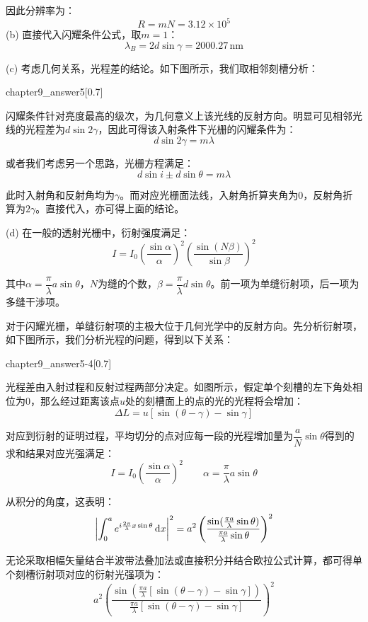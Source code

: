 \begin{solution}
    因此分辨率为：
    \[R = mN = 3.12\times 10^5\]
    (b) 直接代入闪耀条件公式，取$m = 1$：
    \[\lambda_B = 2d\sin\gamma = 2000.27\,\text{nm}\]

    (c) 考虑几何关系，光程差的结论。如下图所示，我们取相邻刻槽分析：
    \begin{singlefigure}[answer5-3]{chapter9_answer5}[0.7]
    \end{singlefigure}

    闪耀条件针对亮度最高的级次，为几何意义上该光线的反射方向。明显可见相邻光线的光程差为$d\sin 2\gamma$，因此可得该入射条件下光栅的闪耀条件为：
    \[d\sin 2\gamma = m\lambda\]

    或者我们考虑另一个思路，光栅方程满足：
    \[d\sin i \pm d\sin\theta = m\lambda\]

    此时入射角和反射角均为$\gamma$。而对应光栅面法线，入射角折算夹角为$0$，反射角折算为$2\gamma$。直接代入，亦可得上面的结论。

    (d) 在一般的透射光栅中，衍射强度满足：
    \[I = I_0\left(\dfrac{\sin\alpha}{\alpha}\right)^2\left(\dfrac{\sin(N\beta)}{\sin\beta}\right)^2\]

    其中$\alpha = \dfrac{\pi}{\lambda}a\sin \theta$，$N$为缝的个数，$\beta = \dfrac{\pi}{\lambda}d\sin \theta$。前一项为单缝衍射项，后一项为多缝干涉项。

    对于闪耀光栅，单缝衍射项的主极大位于几何光学中的反射方向。先分析衍射项，如下图所示，我们分析光程的问题，得到以下关系：
    \begin{singlefigure}[answer5-4]{chapter9_answer5-4}[0.7]
    \end{singlefigure}

    光程差由入射过程和反射过程两部分决定。如图所示，假定单个刻槽的左下角处相位为0，那么经过距离该点$u$处的刻槽面上的点的光的光程将会增加：
    \[\Delta L = u[\sin(\theta - \gamma) - \sin\gamma]\]

    对应到衍射的证明过程，平均切分的点对应每一段的光程增加量为$\dfrac{a}{N}\sin\theta$得到的求和结果对应光强满足：
    \[I = I_0\left(\dfrac{\sin\alpha}{\alpha}\right)^2\qquad \alpha = \dfrac{\pi}{\lambda}a\sin \theta\]

    从积分的角度，这表明：
    \[\left|\int_0^a e^{i\frac{2\pi}{\lambda}x\sin\theta}\dif x\right|^2 = a^2\left(\dfrac{\sin(\frac{\pi a}{\lambda}\sin\theta)}{\frac{\pi a}{\lambda}\sin\theta}\right)^2\]

    无论采取相幅矢量结合半波带法叠加法或直接积分并结合欧拉公式计算，都可得单个刻槽衍射项对应的衍射光强项为：
    \[a^2\left(\dfrac{\sin(\frac{\pi a}{\lambda}[\sin(\theta - \gamma)-\sin\gamma])}{\frac{\pi a}{\lambda}[\sin(\theta - \gamma)-\sin\gamma]}\right)^2\]


\end{solution}
